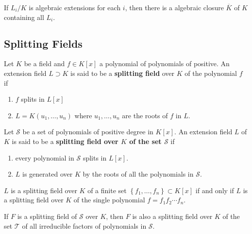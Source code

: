 \begin{corollary}
    If $L_i/K$ is algebraic extensions for each $i$, then there is a algebraic closure $\overline{K}$ of $K$ containing all $L_i$.
\end{corollary}



\subsection{Splitting Fields} %
\begin{definition}
    Let $K$ be a field and $f\in K[x]$ a polynomial of polynomials of positive.
    An extension field $L\supset K$ is said to be a \textbf{splitting field} over $K$ of the polynomial $f$ if
    \begin{enumerate}[label=(\roman*)]
        \item
              $f$ splits in $L[x]$
        \item
              $L= K \left( u _1, \ldots,  u _{{n}}\right)$ where $ u _1, \ldots,  u _{{n}}$ are the roots of $f$ in $L$.
    \end{enumerate}
    Let $\mathcal{S}$ be a set of polynomials of positive degree in $ K [ x ]$.
    An extension field $L$ of $K$ is said to be a \textbf{splitting field over $K$ of the set $\mathcal{S}$} if
    \begin{enumerate}[label=(\roman*)]
        \item
              every polynomial in $\mathcal{S}$ splits in $L[x]$.
        \item
              $L$ is generated over $K$ by the roots of all the polynomials in $\mathcal{S}$.
    \end{enumerate}
    \begin{remark}
        $L$ is a splitting field over $K$ of a finite set $\left\{f_1, \ldots, f_n\right\}\subset K[x]$ if and only if $L$ is a splitting field over $K$ of the single polynomial $f=f_1 f_2 \cdots f_n$.

        If $F$ is a splitting field of $\mathcal{S}$ over $K$, then $F$ is also a splitting field over $K$ of the set $\mathcal{T}$ of all irreducible factors of polynomials in $\mathcal{S}$.
    \end{remark}
\end{definition}


